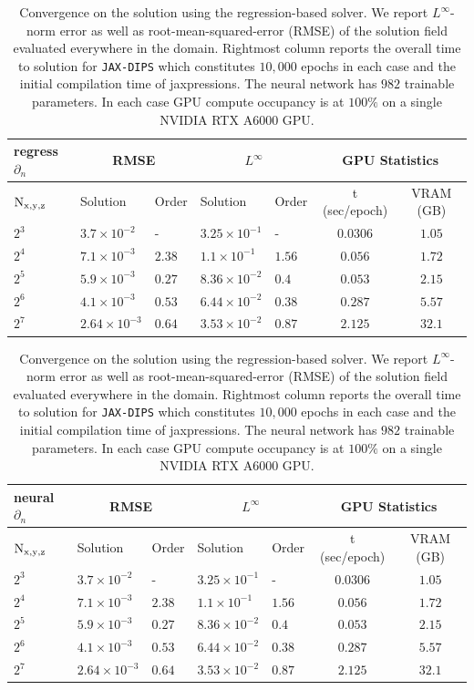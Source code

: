 \documentclass{elsarticle}
\begin{document}
\begin{table}[ht]
\begin{center}
\begin{tabular}{|l||ll|ll|c|c|}
\hline
regress $\partial_n$ & \multicolumn{2}{c|}{RMSE}& \multicolumn{2}{c|}{$L^\infty$} & \multicolumn{2}{c|}{GPU Statistics} \\
\hline
$\rm N_{x,y,z}$   &   Solution    &   Order   &   Solution   &   Order & t (sec/epoch) & VRAM (GB)\\
\hline 
$2^3$ & $3.7\times 10^{-2}$ &  -        & $3.25\times 10^{-1}$  &   -     & $0.0306$ & $1.05$ \\
$2^4$ & $7.1\times 10^{-3}$ &  $2.38$   & $1.1\times 10^{-1}$   & $1.56$  & $0.056$  & $1.72$ \\ 
$2^5$ & $5.9\times 10^{-3}$ &  $0.27$   & $8.36 \times 10^{-2}$ & $0.4$   & $0.053$  & $2.15$ \\ 
$2^6$ & $4.1\times 10^{-3}$ &  $0.53$   & $6.44\times 10^{-2}$  & $0.38$  & $0.287$  & $5.57$ \\ 
$2^7$ & $2.64\times 10^{-3}$&  $0.64$   & $3.53\times 10^{-2}$  & $0.87$  & $2.125$ & $32.1$ \\ \hline
\end{tabular}
\begin{tabular}{|l||ll|ll|c|c|}
\hline
neural $\partial_n$ & \multicolumn{2}{c|}{RMSE}& \multicolumn{2}{c|}{$L^\infty$} & \multicolumn{2}{c|}{GPU Statistics} \\
\hline
$\rm N_{x,y,z}$   &   Solution    &   Order   &   Solution   &   Order & t (sec/epoch) & VRAM (GB)\\
\hline 
$2^3$ & $3.7\times 10^{-2}$ &  -        & $3.25\times 10^{-1}$  &   -     & $0.0306$ & $1.05$ \\
$2^4$ & $7.1\times 10^{-3}$ &  $2.38$   & $1.1\times 10^{-1}$   & $1.56$  & $0.056$  & $1.72$ \\ 
$2^5$ & $5.9\times 10^{-3}$ &  $0.27$   & $8.36 \times 10^{-2}$ & $0.4$   & $0.053$  & $2.15$ \\ 
$2^6$ & $4.1\times 10^{-3}$ &  $0.53$   & $6.44\times 10^{-2}$  & $0.38$  & $0.287$  & $5.57$ \\ 
$2^7$ & $2.64\times 10^{-3}$&  $0.64$   & $3.53\times 10^{-2}$  & $0.87$  & $2.125$ & $32.1$ \\ \hline
\end{tabular}
\caption{Convergence on the solution using the regression-based solver. We report $L^\infty$-norm error as well as root-mean-squared-error (RMSE) of the solution field evaluated everywhere in the domain. Rightmost column reports the overall time to solution for \texttt{JAX-DIPS} which constitutes $10,000$ epochs in each case and the initial compilation time of jaxpressions. The neural network has $982$ trainable parameters. In each case GPU compute occupancy is at $100\%$ on a single NVIDIA RTX A6000 GPU.}
\end{center}
\end{table}
\end{document}
